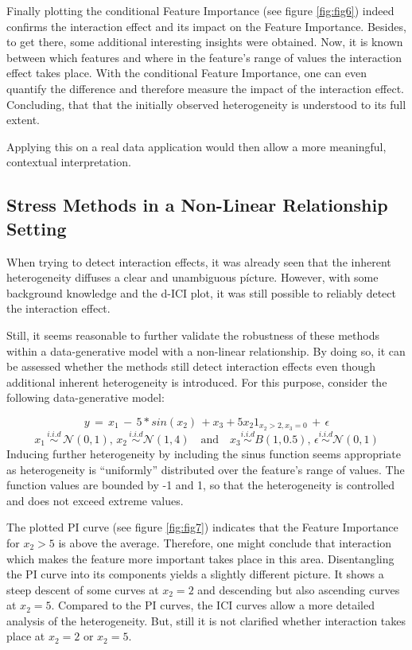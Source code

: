 \documentclass[]{krantz}
\begin{document}
Finally plotting the conditional Feature Importance (see figure
\ref{fig:fig6}) indeed confirms the interaction effect and its impact on
the Feature Importance. Besides, to get there, some additional
interesting insights were obtained. Now, it is known between which
features and where in the feature's range of values the interaction
effect takes place. With the conditional Feature Importance, one can
even quantify the difference and therefore measure the impact of the
interaction effect. Concluding, that that the initially observed
heterogeneity is understood to its full extent.

Applying this on a real data application would then allow a more
meaningful, contextual interpretation.

\subsection{Stress Methods in a Non-Linear Relationship
Setting}\label{ch323}

When trying to detect interaction effects, it was already seen that the
inherent heterogeneity diffuses a clear and unambiguous pícture.
However, with some background knowledge and the d-ICI plot, it was still
possible to reliably detect the interaction effect.

Still, it seems reasonable to further validate the robustness of these
methods within a data-generative model with a non-linear relationship.
By doing so, it can be assessed whether the methods still detect
interaction effects even though additional inherent heterogeneity is
introduced. For this purpose, consider the following data-generative
model:

\[y \, = \, x_{1} \,  - \, 5*sin(x_{2}) \, + x_{3} + 5x_{2} 1_{x_2 > 2, x_3 = 0} \, + \, \epsilon\]
\[ x_{1} \, \overset{i.i.d}{\sim} \, \mathcal{N}(0,1), \, x_{2} \, \overset{i.i.d}{\sim}  \mathcal{N}(1, 4) \quad \text{and} \quad x_{3} \overset{i.i.d}{\sim} B(1, 0.5),\,  \epsilon \overset{i.i.d}{\sim} \mathcal{N}(0, 1)\]
Inducing further heterogeneity by including the sinus function seems
appropriate as heterogeneity is ``uniformly'' distributed over the
feature's range of values. The function values are bounded by -1 and 1,
so that the heterogeneity is controlled and does not exceed extreme
values.

The plotted PI curve (see figure \ref{fig:fig7}) indicates that the
Feature Importance for \(x_2 > 5\) is above the average. Therefore, one
might conclude that interaction which makes the feature more important
takes place in this area. Disentangling the PI curve into its components
yields a slightly different picture. It shows a steep descent of some
curves at \(x_2 = 2\) and descending but also ascending curves at
\(x_2 = 5\). Compared to the PI curves, the ICI curves allow a more
detailed analysis of the heterogeneity. But, still it is not clarified
whether interaction takes place at \(x_2 = 2\) or \(x_2 = 5\).
\end{document}
